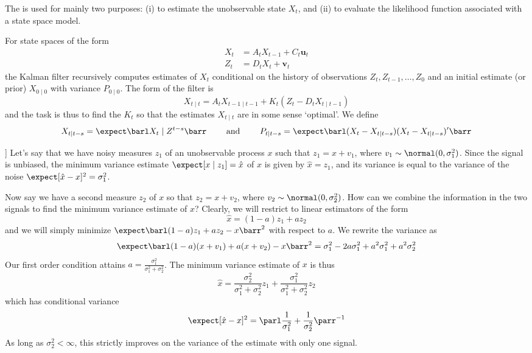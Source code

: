 \documentclass[10pt]{article}
\begin{document}
\begin{definition}
	The  is used for mainly two purposes: (i) to estimate the unobservable state $X_t$, and (ii) to evaluate the likelihood function associated with a state space model.
	
	For state spaces of the form \begin{align*} X_t &= A_t X_{t-1} + C_t \bm{u}_t \\ Z_t &= D_tX_t + \bm{v}_t\end{align*}the Kalman filter recursively computes estimates of $X_t$ conditional on the history of observations $Z_t,Z_{t-1},\dots,Z_0$ and an initial estimate (or prior) $X_{0\mid0}$ with variance $P_{0\mid0}$. The form of the filter is \[X_{t\mid t} = A_t X_{t-1 \mid t-1} + K_t (Z_t - D_t X_{t \mid t-1})\]and the task is thus to find the  $K_t$ so that the estimates $X_{t \mid t}$ are in some sense `optimal'. We define \[X_{t \mid t-s} = \expect \barl X_t \mid Z^{t-s}\barr \qquad \text{ and } \qquad P_{t \mid t-s} = \expect \barl (X_t - X_{t \mid t-s})(X_t - X_{t \mid t-s})'\barr\]
\end{definition}

\begin{example}] 
	Let's say that we have noisy measures $z_1$ of an unobservable process $x$ such that $z_1 = x + v_1$, where $v_1 \sim \normal(0,\sigma_1^2)$. Since the signal is unbiased, the minimum variance estimate $\expect[x \mid z_1] = \hat{x}$ of $x$ is given by $\hat{x} = z_1$, and its variance is equal to the variance of the noise $\expect[\hat{x}-x]^2 = \sigma_1^2$. 
	
	Now say we have a second measure $z_2$ of $x$ so that $z_2 = x + v_2$, where $v_2 \sim \normal(0,\sigma_2^2)$. How can we combine the information in the two signals to find the minimum variance estimate of $x$? Clearly, we will restrict to linear estimators of the form \[\hat{x} = (1-a)z_1 + az_2\]and we will simply minimize $\expect\barl (1-a)z_1 + az_2 - x\barr^2$ with respect to $a$.  We rewrite the variance as\[\expect \barl (1-a)(x+v_1) + a(x+v_2) - x\barr^2 = \sigma_1^2 - 2a \sigma_1^2 + a^2 \sigma_1^2 + a^2 \sigma_2^2\]Our first order condition attains $a = \frac{\sigma_1^2}{\sigma_1^2 + \sigma_2^2}$. The minimum variance estimate of $x$ is thus\[\hat{x} = \frac{\sigma_2^2}{\sigma_1^2 + \sigma_2^2}z_1 + \frac{\sigma_1^2}{\sigma_1^2 + \sigma_2^2}z_2\]which has conditional variance \[\expect[\hat{x}-x]^2 = \parl \frac{1}{\sigma^2_1} + \frac{1}{\sigma^2_2}\parr^{-1}\]As long as $\sigma_2^2 < \infty$, this strictly improves on the variance of the estimate with only one signal. 
\end{example}
\end{document}
